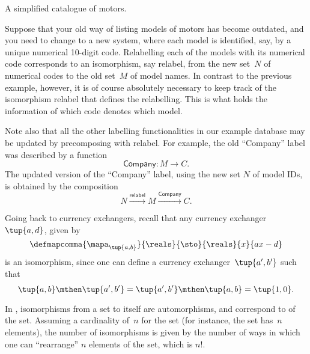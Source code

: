\begin{example}[Relabelling]
\begin{table*}[h]
        \caption{
            A simplified catalogue of motors.
        }
        \label{tab:electric_motors}
    \end{table*}
    Suppose that your old way of listing models of motors has become outdated, and you need to change to a new system, where each model is identified, say, by a unique numerical 10-digit code.
    Relabelling each of the models with its numerical code corresponds to an isomorphism, say \textsf{relabel}, from the new set~$N$ of numerical codes to the old set~$M$ of model names.
    In contrast to the previous example, however, it is of course absolutely necessary to keep track of the isomorphism \textsf{relabel} that defines the relabelling.
    This is what holds the information of which code denotes which model.

    Note also that all the other labelling functionalities in our example database may be updated by precomposing with \textsf{relabel}.
    For example, the old ``Company'' label was described by a function
    \begin{equation}
        \textsf{Company}\colon M \to C.
    \end{equation}
    The updated version of the ``Company'' label, using the new set $N$ of model IDs, is obtained by the composition
    \begin{equation}
        N \overset{\textsf{relabel}}{\longrightarrow} M \overset{\textsf{Company}}{\longrightarrow} C.
    \end{equation}
\end{example}

\begin{example}
    Going back to currency exchangers, recall that any currency exchanger~$\tup{a,d}$, given by
    \begin{equation}
        \defmapcomma{
            \mapa_{\tup{a,b}}
        }{
            \reals
        }{
            \sto
        }{
            \reals
        }{
            x
        }{
            ax-d
        }
    \end{equation}
    is an isomorphism, since one can define a currency exchanger~$\tup{a',b'}$ such that
    \begin{equation}
        \tup{a,b}\mthen \tup{a',b'}=\tup{a',b'}\mthen \tup{a,b}=\tup{1,0}.
    \end{equation}
\end{example}

\begin{example}
    In \FinSet, isomorphisms from a set to itself are automorphisms, and correspond to \emph{} of the set.
    Assuming a cardinality of~$n$ for the set (for instance, the set has~$n$ elements), the number of isomorphisms is given by the number of ways in which one can ``rearrange'' $n$ elements of the set, which is $n!
    $.
\end{example}

